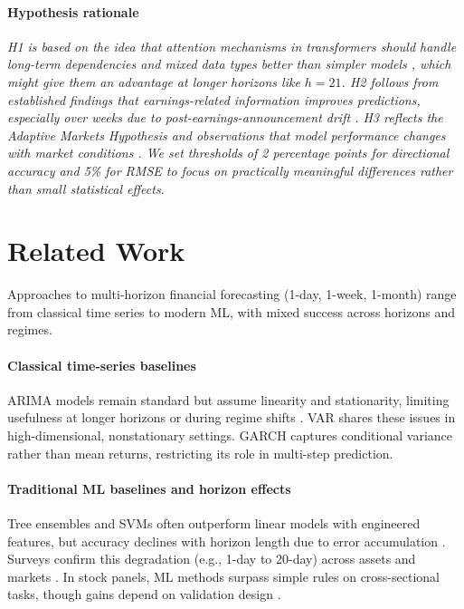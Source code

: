 \documentclass[conference,a4paper]{IEEEtran}
\newcommand{\simp}[1]{{\itshape #1}}
\begin{document}
\paragraph{Hypothesis rationale}
\simp{H1 is based on the idea that attention mechanisms in transformers should handle long-term dependencies and mixed data types better than simpler models \citep{lim2021temporal}, which might give them an advantage at longer horizons like $h{=}21$. H2 follows from established findings that earnings-related information improves predictions, especially over weeks due to post-earnings-announcement drift \citep{bernard1989,schnaubelt2020}. H3 reflects the Adaptive Markets Hypothesis \citep{lo2004} and observations that model performance changes with market conditions \citep{zhang2023review}. We set thresholds of 2 percentage points for directional accuracy and 5\% for RMSE to focus on practically meaningful differences rather than small statistical effects.}



\section{Related Work}
Approaches to multi-horizon financial forecasting (1-day, 1-week, 1-month) range from classical time series to modern ML, with mixed success across horizons and regimes.

\paragraph{Classical time-series baselines} ARIMA models remain standard but assume linearity and stationarity, limiting usefulness at longer horizons or during regime shifts \citep{box2015}. VAR shares these issues in high-dimensional, nonstationary settings. GARCH captures conditional variance rather than mean returns, restricting its role in multi-step prediction.

\paragraph{Traditional ML baselines and horizon effects} Tree ensembles and SVMs often outperform linear models with engineered features, but accuracy declines with horizon length due to error accumulation \citep{gu2018,chen2016xgboost}. Surveys confirm this degradation (e.g., 1-day to 20-day) across assets and markets \citep{zhang2023review}. In stock panels, ML methods surpass simple rules on cross-sectional tasks, though gains depend on validation design \citep{gu2018}.
\end{document}
